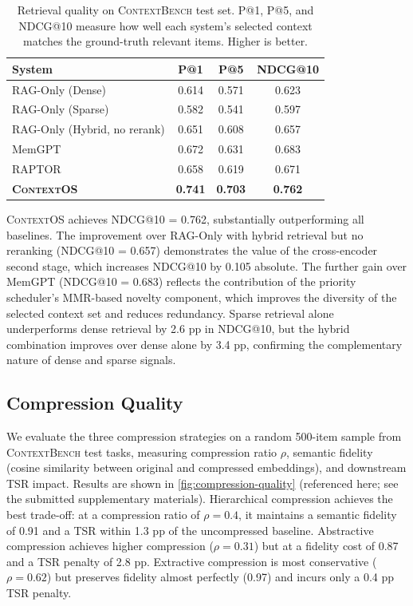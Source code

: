 \documentclass[review,12pt]{elsarticle}
\newcommand{\contextos}{\textsc{ContextOS}}
\newcommand{\contextbench}{\textsc{ContextBench}}
\begin{document}
\begin{table}[t]
\centering
\caption{Retrieval quality on \contextbench{} test set.  P@1, P@5, and
  NDCG@10 measure how well each system's selected context matches the
  ground-truth relevant items.  Higher is better.}
\label{tab:retrieval-quality}
\begin{tabular}{lccc}
\toprule
\textbf{System} & \textbf{P@1} & \textbf{P@5} & \textbf{NDCG@10} \\
\midrule
RAG-Only (Dense)          & 0.614 & 0.571 & 0.623 \\
RAG-Only (Sparse)         & 0.582 & 0.541 & 0.597 \\
RAG-Only (Hybrid, no rerank) & 0.651 & 0.608 & 0.657 \\
MemGPT                    & 0.672 & 0.631 & 0.683 \\
RAPTOR                    & 0.658 & 0.619 & 0.671 \\
\textbf{\contextos{}}     & \textbf{0.741} & \textbf{0.703} & \textbf{0.762} \\
\bottomrule
\end{tabular}
\end{table}

\contextos{} achieves NDCG@10 = 0.762, substantially outperforming all
baselines.  The improvement over RAG-Only with hybrid retrieval but no
reranking (NDCG@10 = 0.657) demonstrates the value of the cross-encoder
second stage, which increases NDCG@10 by 0.105 absolute.  The further gain
over MemGPT (NDCG@10 = 0.683) reflects the contribution of the priority
scheduler's MMR-based novelty component, which improves the diversity of
the selected context set and reduces redundancy.  Sparse retrieval alone
underperforms dense retrieval by 2.6 pp in NDCG@10, but the hybrid
combination improves over dense alone by 3.4 pp, confirming the complementary
nature of dense and sparse signals.

\subsection{Compression Quality}
\label{subsec:compression-quality}

We evaluate the three compression strategies on a random 500-item sample from
\contextbench{} test tasks, measuring compression ratio $\rho$,
semantic fidelity (cosine similarity between original and compressed embeddings),
and downstream TSR impact.  Results are shown in \cref{fig:compression-quality}
(referenced here; see the submitted supplementary materials).  Hierarchical
compression achieves the best trade-off: at a compression ratio of $\rho = 0.4$,
it maintains a semantic fidelity of 0.91 and a TSR within 1.3 pp of the
uncompressed baseline.  Abstractive compression achieves higher compression
($\rho = 0.31$) but at a fidelity cost of 0.87 and a TSR penalty of 2.8 pp.
Extractive compression is most conservative ($\rho = 0.62$) but preserves
fidelity almost perfectly (0.97) and incurs only a 0.4 pp TSR penalty.
\end{document}
